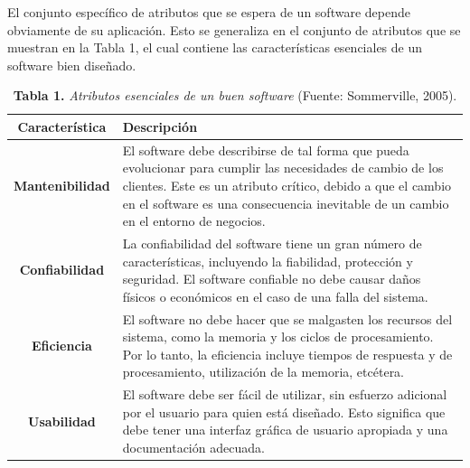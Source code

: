 \documentclass[12pt, a4paper]{article}
\begin{document}
El conjunto espec\'{i}fico de atributos que se espera de un software depende obviamente de su aplicaci\'{o}n. Esto se generaliza en el conjunto de atributos que se muestran en la Tabla 1, el cual contiene las caracter\'{i}sticas esenciales de un software bien dise\~{n}ado.

\begin{table}[htb]
	\small
	\centering
	\setlength{\extrarowheight}{5pt}
	\begin{tabulary}{15cm}{|c|L|}
		\hline
		\textbf{Caracter\'{i}stica} & \textbf{Descripci\'{o}n}\\ \hline
		\textbf{Mantenibilidad} & El software debe describirse de tal forma que pueda evolucionar  para cumplir las necesidades de cambio de los 					clientes. Este es un atributo cr\'{i}tico, debido a que el cambio en el software es una consecuencia inevitable de un cambio en el entorno de 					negocios.\\ \hline
		\textbf{Confiabilidad} & La confiabilidad del software tiene un gran n\'{u}mero de caracter\'{i}sticas, incluyendo la fiabilidad, protecci\'{o}n y seguridad. El software confiable no debe causar da\~{n}os f\'{i}sicos o econ\'{o}micos en el caso de una falla del sistema.\\ \hline
		\textbf{Eficiencia} & El software no debe hacer que se malgasten los recursos del sistema, como la memoria y los ciclos de procesamiento. Por lo tanto, la eficiencia incluye tiempos de respuesta y de procesamiento, utilizaci\'{o}n de la memoria, etc\'{e}tera.\\ \hline
		\textbf{Usabilidad} & El software debe ser f\'{a}cil de utilizar, sin esfuerzo adicional por el usuario para quien est\'{a} dise\~{n}ado. Esto significa que debe tener una interfaz gr\'{a}fica de usuario apropiada y una documentaci\'{o}n adecuada.\\ \hline
	\end{tabulary}
	\caption{\textbf{Tabla 1.} \textit{Atributos esenciales de un buen software}		(Fuente: Sommerville, 2005).}
\end{table}
\FloatBarrier %
\end{document}
